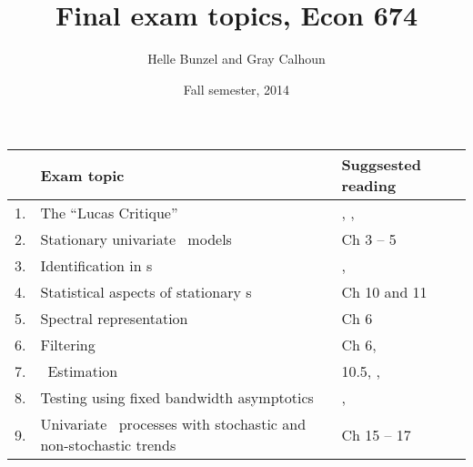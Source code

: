 \documentclass[nofonts,nols]{tufte-handout}
\title{Final exam topics, Econ 674}
\author{Helle Bunzel and Gray Calhoun}
\date{Fall semester, 2014}
\renewcommand{\allcaps}[1]{\textls{\MakeUppercase{#1}}}
\newcommand{\ARMA}{\allcaps{ARMA}}
\newcommand{\HAC}{\allcaps{HAC}}
\newcommand{\SVAR}{\allcaps{SVAR}}
\newcommand{\VAR}{\allcaps{VAR}}
\begin{document}
\maketitle

\begin{table*}[h]
  \begin{tabularx}{\textwidth}{rXX}
    \toprule
        & Exam topic                                                             & Suggsested reading                                                                                      \\
    \midrule
    1.  & The ``Lucas Critique''                                                 & \citep{Lu76}, \citep{No11}, \citep{Si12}                                                                \\
    2.  & Stationary univariate \ARMA\ models                                    & \citep{Ha94} Ch 3 -- 5                                                                                  \\
    3.  & Identification in \SVAR s                                              & \citep{Si80}, \citep{Ki13}                                                                              \\
    4.  & Statistical aspects of stationary \VAR s                               & \citep{Ha94} Ch 10 and 11                                                                               \\
    5.  & Spectral representation                                                & \citep{Ha94} Ch 6                                                                                       \\
    6.  & Filtering                                                              & \citep{Ha94} Ch 6, \citep{BK99}                                                                         \\
    7.  & \HAC\ Estimation                                                       & \citep{Ha94} 10.5, \citep{NW87}, \citep{An91}                                                           \\
    8.  & Testing using fixed bandwidth asymptotics                              & \citep{KV05}, \citep{Su14}                                                                              \\
    9.  & Univariate \ARMA\ processes with stochastic and non-stochastic trends  & \citep{Ha94} Ch 15 -- 17                                                                                \\

\end{tabularx}
\end{table*}
\end{document}
